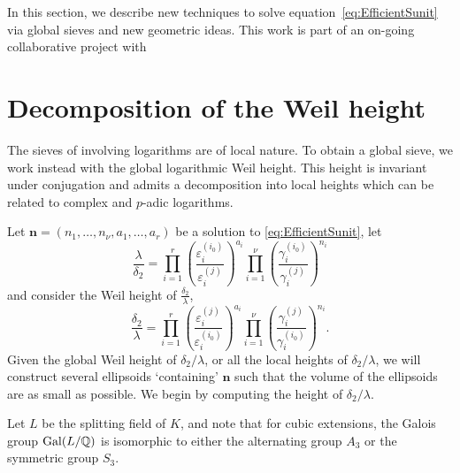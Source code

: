 In this section, we describe new techniques to solve equation~\eqref{eq:EfficientSunit} via global sieves and new geometric ideas. This work is part of an on-going collaborative project with 

\section{Decomposition of the Weil height} 

The sieves of \cite{TW3} involving logarithms are of local nature. To obtain a global sieve, we work instead with the global logarithmic Weil height. This height is invariant under conjugation and admits a decomposition into local heights which can be related to complex and $p$-adic logarithms. 

Let $\mathbf{n} = (n_1, \dots, n_{\nu}, a_1, \dots, a_r)$ be a solution to \eqref{eq:EfficientSunit}, let
\[\frac{\lambda}{\delta_2}= \prod_{i = 1}^{r}\left( \frac{\varepsilon_i^{(i_0)}}{\varepsilon_i^{(j)}}\right)^{a_i} \prod_{i = 1}^{\nu} \left( \frac{\gamma_i^{(i_0)}}{\gamma_i^{(j)}}\right)^{n_i}\]
and consider the Weil height of $\frac{\delta_2}{\lambda}$, 
\[\frac{\delta_2}{\lambda}= \prod_{i = 1}^{r}\left( \frac{\varepsilon_i^{(j)}}{\varepsilon_i^{(i_0)}}\right)^{a_i} \prod_{i = 1}^{\nu} \left( \frac{\gamma_i^{(j)}}{\gamma_i^{(i_0)}}\right)^{n_i}.\]
Given the global Weil height of $\delta_2/\lambda$, or all the local heights of $\delta_2/\lambda$, we will construct several ellipsoids `containing' $\mathbf{n}$ such that the volume of the ellipsoids are as small as possible. We begin by computing the height of $\delta_2/\lambda$. 

Let $L$ be the splitting field of $K$, and note that for cubic extensions, the Galois group $\operatorname{Gal}(L/\mathbb{Q})$ is isomorphic to either the alternating group $A_3$ or the symmetric group $S_3$. 

